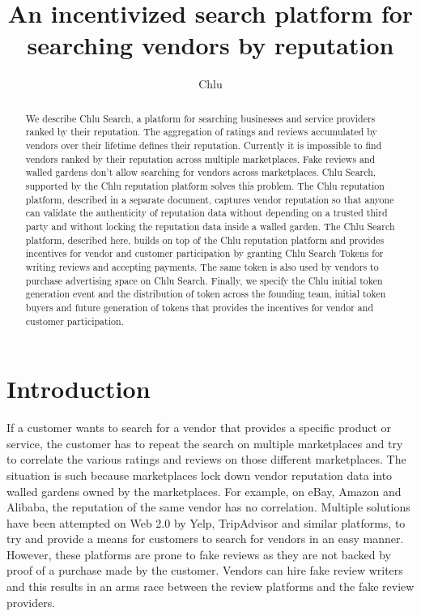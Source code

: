 \documentclass[a4paper]{article}
\title{An incentivized search platform for searching vendors by reputation}
\author{
  Chlu
}
\begin{document}
\maketitle

\begin{abstract}

  We describe Chlu Search, a platform for searching businesses and
  service providers ranked by their reputation. The aggregation of
  ratings and reviews accumulated by vendors over their lifetime
  defines their reputation. Currently it is impossible to find vendors
  ranked by their reputation across multiple marketplaces. Fake
  reviews and walled gardens don't allow searching for vendors across
  marketplaces. Chlu Search, supported by the Chlu reputation platform
  solves this problem. The Chlu reputation platform, described in a
  separate document, captures vendor reputation so that anyone can
  validate the authenticity of reputation data without depending on a
  trusted third party and without locking the reputation data inside a
  walled garden. The Chlu Search platform, described here, builds on
  top of the Chlu reputation platform and provides incentives for vendor
  and customer participation by granting Chlu Search Tokens for
  writing reviews and accepting payments. The same token is also used
  by vendors to purchase advertising space on Chlu Search. Finally, we
  specify the Chlu initial token generation event and the distribution
  of token across the founding team, initial token buyers and future
  generation of tokens that provides the incentives for vendor and
  customer participation.

\end{abstract}

\section{Introduction}

If a customer wants to search for a vendor that provides a specific
product or service, the customer has to repeat the search on multiple
marketplaces and try to correlate the various ratings and reviews on
those different marketplaces. The situation is such because
marketplaces lock down vendor reputation data into walled gardens
owned by the marketplaces. For example, on eBay, Amazon and Alibaba,
the reputation of the same vendor has no correlation. Multiple
solutions have been attempted on Web 2.0 by Yelp, TripAdvisor and
similar platforms, to try and provide a means for customers to search
for vendors in an easy manner. However, these platforms are prone to
fake reviews as they are not backed by proof of a purchase made by the
customer. Vendors can hire fake review writers and this results in an
arms race between the review platforms and the fake review providers.
\end{document}
